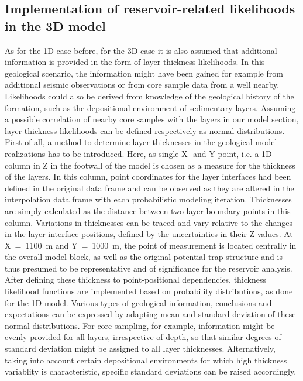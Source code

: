 		\subsection{Implementation of reservoir-related likelihoods in the 3D model}
		As for the 1D case before, for the 3D case it is also assumed that additional information is provided in the form of layer thickness likelihoods. In this geological scenario, the information might have been gained for example from additional seismic observations or from core sample data from a well nearby. Likelihoods could also be derived from knowledge of the geological history of the formation, such as the depositional environment of sedimentary layers. Assuming a possible correlation of nearby core samples with the layers in our model section, layer thickness likelihoods can be defined respectively as normal distributions.\\
		First of all, a method to determine layer thicknesses in the geological model realizations has to be introduced. Here, as single X- and Y-point, i.e. a 1D column in Z in the footwall of the model is chosen as a measure for the thickness of the layers. In this column, point coordinates for the layer interfaces had been defined in the original data frame and can be observed as they are altered in the interpolation data frame with each probabilistic modeling iteration. Thicknesses are simply calculated as the distance between two layer boundary points in this column. Variations in thicknesses can be traced and vary relative to the changes in the layer interface positions, defined by the uncertainties in their Z-values. At X~=~1100~m and Y~=~1000~m, the point of measurement is located centrally in the overall model block, as well as the original potential trap structure and is thus presumed to be representative and of significance for the reservoir analysis.\\
		After defining these thickness to point-positional dependencies, thickness likelihood functions are implemented based on probability distributions, as done for the 1D model. Various types of geological information, conclusions and expectations can be expressed by adapting mean and standard deviation of these normal distributions. For core sampling, for example, information might be evenly provided for all layers, irrespective of depth, so that similar degrees of standard deviation might be assigned to all layer thicknesses. Alternatively, taking into account certain depositional environments for which high thickness variablity is characteristic, specific standard deviations can be raised accordingly.\\

